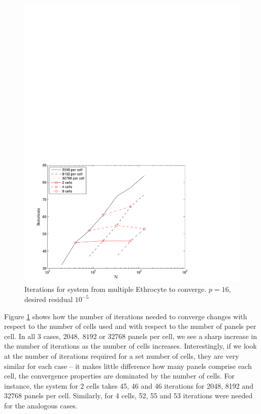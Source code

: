 \begin{figure}
\begin{center}
	\includegraphics[width=11.5cm]{img/StokesMultipleCellsIterations.pdf}
	\caption{Iterations for system from multiple Ethrocyte to converge. $p = 16$, desired residual $10^{-5}$}
	\label{fig:multiple_cell_iterations}
\end{center}
\end{figure}

Figure \ref{fig:multiple_cell_iterations} shows how the number of iterations needed to converge changes with respect to the number of cells used and with respect to the number of panels per cell. In all 3 cases, $2048,\;8192$ or $32768$ panels per cell, we see a sharp increase in the number of iterations as the number of cells increases. Interestingly, if we look at the number of iterations required for a set number of cells, they are very similar for each case -- it makes little difference how many panels comprise each cell, the convergence properties are dominated by the number of cells. For instance, the system for 2 cells takes 45, 46 and 46 iterations for 2048, 8192 and 32768 panels per cell. Similarly, for 4 cells, 52, 55 and 53 iterations were needed for the analogous cases.

